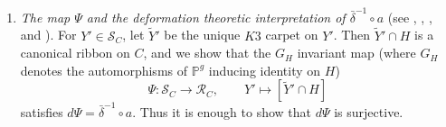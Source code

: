 \documentclass[11pt,twoside]{amsart}
\theoremstyle{plain}
\theoremstyle{definition}
\newcommand{\Yt}{\widetilde{Y}}
\newcommand{\Ct}{\widetilde{C}}
\newcommand{\SC}{\mathcal{S}_C}
\newcommand{\RC}{\mathcal{R}_C}
\newcommand{\Dd}{D}
\begin{document}
\begin{enumerate}
    \item[(3)] \emph{The map $\Psi$ and the deformation theoretic interpretation of $\bar\delta^{-1}\circ a$} (see , , ,  and ). For $Y' \in \SC$, let $\Yt'$ be the unique $K3$ carpet on $Y'$. Then $\Yt' \cap H$ is a canonical ribbon on $C$, and we show that the $G_H$ invariant map (where $G_H$ denotes the automorphisms of $\mathbb{P}^{g}$ inducing identity on $H$)
    \[
    \Psi\colon \SC \longrightarrow \RC, \qquad Y' \longmapsto [\Yt' \cap H]
    \]
    satisfies $d\Psi = \bar\delta^{-1}\circ a$. Thus it is enough to show that $d\Psi$ is surjective.


\end{enumerate}
\end{document}

